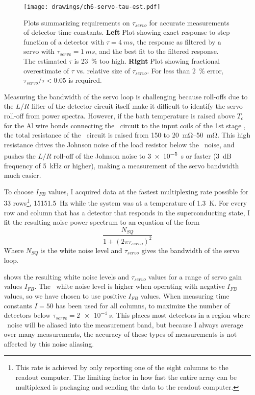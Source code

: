 \begin{figure*}
\texttt{[image: drawings/ch6-servo-tau-est.pdf]}
\caption[Required $\tau_{servo}$]{
Plots summarizing requirements on $\tau_{servo}$ for accurate measurements of detector time constants.
\textbf{Left} Plot showing exact response to step function of a detector with $\tau = \SI{4}{ms}$, the response as filtered by a servo with $\tau_{servo} = \SI{1}{ms}$, and the best fit to the filtered response. The estimated $\tau$ is \SI{23}{\percent} too high.
\textbf{Right} Plot showing fractional overestimate of $\tau$ vs. relative size of $\tau_{servo}$.
For less than \SI{2}{\percent} error, $\tau_{servo}/\tau < \num{0.05}$ is required.
}
\label{fig:ch6-servo-tau-est}
\end{figure*}

Measuring the bandwidth of the servo loop is challenging because roll-offs due to the $L/R$ filter of the detector circuit itself make it difficult to identify the servo roll-off from power spectra.
However, if the bath temperature is raised above $T_c$ for the Al wire bonds connecting the \TES\ circuit to the input coils of the 1st stage \SQUIDs, the total resistance of the \TES\ circuit is raised from \SI{150}{\uOhm} to \SIrange{20}{50}{\mohm}.
This high resistance drives the Johnson noise of the load resistor below the \SQUID\ noise, and pushes the $L/R$ roll-off of the Johnson noise to \SI{3e-5}{s} or faster (\SI{3}{\dB} frequency of \SI{5}{\kilo\Hz} or higher), making a measurement of the servo bandwidth much easier.

To choose $I_{FB}$ values, I acquired data at the fastest multiplexing rate possible for 33 rows\footnote{This rate is achieved by only reporting one of the eight columns to the readout computer. The limiting factor in how fast the entire array can be multiplexed is packaging and sending the data to the readout computer.}, \SI{15151.5}{Hz} while the system was at a temperature of \SI{1.3}{\K}.
For every row and column that has a detector that responds in the superconducting state, I fit the resulting noise power spectrum to an equation of the form
\begin{equation}
  \frac{N_{SQ}}{1 + (2 \pi \tau_{servo})^2}
\end{equation}
Where $N_{SQ}$ is the white noise level and $\tau_{servo}$ gives the bandwidth of the servo loop.

 shows the resulting white noise levels and $\tau_{servo}$ values for a range of servo gain values $I_{FB}$.
The \SQUID\ white noise level is higher when operating with negative $I_{FB}$ values, so we have chosen to use positive $I_{FB}$ values.
When measuring time constants $I=50$ has been used for all columns, to maximize the number of detectors below $\tau_{servo} = \SI{2e-4}{s}$.
This places most detectors in a region where \SQUID\ noise will be aliased into the measurement band, but because I always average over many measurements, the accuracy of these types of measurements is not affected by this noise aliasing.

